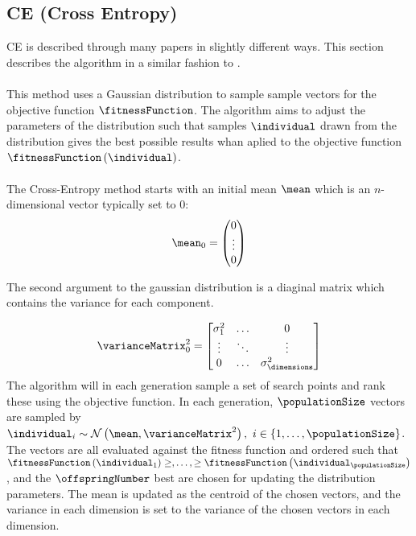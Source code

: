 \subsection{CE (Cross Entropy) \label{CrossEntropy}}
CE is described through many papers in 
slightly different ways. This section
describes the algorithm in a similar fashion 
to \citep{thiery:09}.\\
\\
This method uses a Gaussian distribution to 
sample sample vectors for the objective function
$\fitnessFunction$. The algorithm aims to 
adjust the parameters of the distribution
such that samples $\individual$ drawn from the distribution
gives the best possible results whan aplied to the
objective function $\fitnessFunction \left( \individual \right)$.\\
\\
The Cross-Entropy method starts with an initial 
mean $\mean$ which is an $n$-dimensional vector
typically set to 0:
\begin{align*}
\mean_0 = \begin{pmatrix}
0\\
\vdots\\
0
\end{pmatrix} 
\end{align*}

The second argument to the gaussian distribution is a 
diaginal matrix which contains the variance for each 
component.

\begin{align*}
\varianceMatrix_0^{2} =
\begin{bmatrix}
\sigma_1^{2} & \hdots & 0\\
\vdots & \ddots & \vdots\\
0 & \hdots & \sigma_{\dimensions}^{2}
\end{bmatrix}
\end{align*}
The algorithm will in each generation sample a set of search points
and rank these using the objective function.
In each generation, $\populationSize$ vectors are sampled by 
$\individual_{i} \sim \mathcal{N} \left(\mean, \varianceMatrix^{2} \right)
,\ i \in \{1,\dots,\populationSize \}$. The vectors are all evaluated 
against the fitness function and ordered such that $\fitnessFunction \left( \individual_{1} \right) \geq, \dots, \geq \fitnessFunction \left( \individual_{\populationSize} \right)$
, and the $\offspringNumber$ best are chosen for updating the distribution 
parameters. The mean is updated as the centroid of the chosen vectors, and
the variance in each dimension is set to the variance of the chosen vectors in each 
dimension.\\

